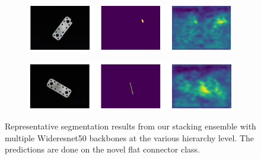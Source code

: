 \begin{figure}[htbp]
\begin{subfigure}[b]{0.3\textwidth}
    \end{subfigure}
    \begin{subfigure}[b]{0.3\textwidth}
        \centering
        \includegraphics[width=\textwidth]{figures/ensemblehierarchyimages/image_prediction_071.png}


    \end{subfigure}
    \begin{subfigure}[b]{0.3\textwidth}
        \centering
        \includegraphics[width=\textwidth]{figures/ensemblehierarchyimages/image_prediction_089.png}


    \end{subfigure}
    \caption{Representative segmentation results from our stacking ensemble with multiple Wideresnet50 backbones at the various hierarchy level. The predictions are done on the novel flat 
             connector class.}
    \label{fig:ensemblehierarchy}
\end{figure}